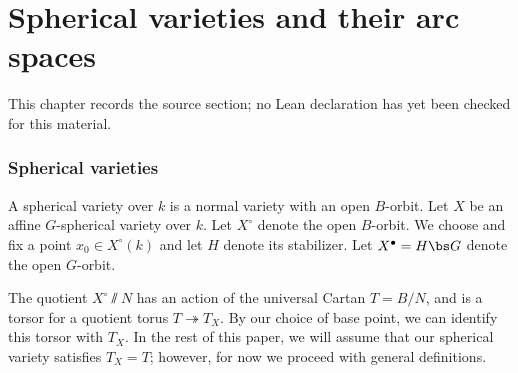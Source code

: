 \chapter{Spherical varieties and their arc spaces}
\label{intersection-complexes-unramified-l-factors-chapter-02}

\begin{remark}
\label{intersection-complexes-unramified-l-factors-chapter-02-source}
This chapter records the source section; no Lean declaration has yet been checked for this material.
\notready
\end{remark}

\label{section-spherical}

\subsection{Spherical varieties}
\label{sect:spherical}

A spherical variety over $k$ is a normal variety with an open $B$-orbit.
Let $X$ be an affine $G$-spherical variety over $k$. Let $X^\circ$ denote the open $B$-orbit. We choose and fix a point $x_0 \in X^\circ(k)$ and let $H$ denote its stabilizer.
Let $X^\bullet= H\bs G $ denote the open $G$-orbit.

The quotient $X^\circ\sslash N$ has an action of the universal Cartan $T=B/N$, and is a torsor for a quotient torus $T\twoheadrightarrow T_X$. By our choice of base point, we can identify this torsor with $T_X$. In the rest of this paper, we will assume that our spherical variety satisfies $T_X=T$; however, for now we proceed with general definitions.

